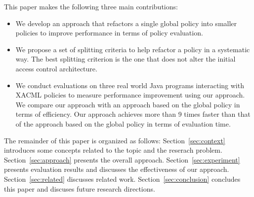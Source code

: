 This paper makes the following three main contributions:
\begin{itemize}
\item We develop an approach that refactors a single global policy into smaller policies to improve performance in terms of policy evaluation.
\item We propose a set of splitting criteria to help refactor a policy in a systematic way. The best splitting criterion is the one
that does not alter the initial access control architecture.
\item We conduct evaluations on three real world Java programs interacting with XACML policies to measure performance improvement
using our approach. We compare our approach with an approach based on the global policy in terms of efficiency. 
Our approach achieves more than 9 times faster than that of the approach based on the global policy in terms of evaluation time.
\end{itemize}


The remainder of this paper is organized as follows: Section~\ref{sec:context} introduces some concepts related to the topic and the reserach problem.
Section~\ref{sec:approach} presents the overall approach. 
Section~\ref{sec:experiment} presents evaluation results and discusses the effectiveness of our approach. Section~\ref{sec:related} discusses related work.
Section~\ref{sec:conclusion} concludes this paper and discuses future research directions.


